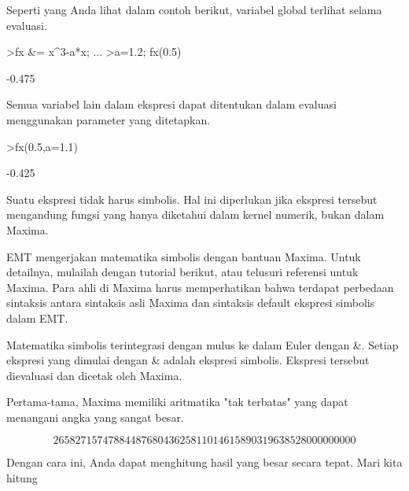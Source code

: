 \documentclass[a4paper,10pt]{article}
\begin{document}
\begin{eulernotebook}
\begin{eulercomment}
\begin{eulercomment}
\begin{eulercomment}
Seperti yang Anda lihat dalam contoh berikut, variabel global terlihat
selama evaluasi.
\end{eulercomment}
\begin{eulerprompt}
>fx &= x^3-a*x;  ...
>a=1.2; fx(0.5)
\end{eulerprompt}
\begin{euleroutput}
  -0.475
\end{euleroutput}
\begin{eulercomment}
Semua variabel lain dalam ekspresi dapat ditentukan dalam evaluasi
menggunakan parameter yang ditetapkan.
\end{eulercomment}
\begin{eulerprompt}
>fx(0.5,a=1.1)
\end{eulerprompt}
\begin{euleroutput}
  -0.425
\end{euleroutput}
\begin{eulercomment}
Suatu ekspresi tidak harus simbolis. Hal ini diperlukan jika ekspresi
tersebut mengandung fungsi yang hanya diketahui dalam kernel numerik,
bukan dalam Maxima.

\begin{eulercomment}
\begin{eulercomment}
EMT mengerjakan matematika simbolis dengan bantuan Maxima. Untuk
detailnya, mulailah dengan tutorial berikut, atau telusuri referensi
untuk Maxima. Para ahli di Maxima harus memperhatikan bahwa terdapat
perbedaan sintaksis antara sintaksis asli Maxima dan sintaksis default
ekspresi simbolis dalam EMT.

Matematika simbolis terintegrasi dengan mulus ke dalam Euler dengan \&.
Setiap ekspresi yang dimulai dengan \& adalah ekspresi simbolis.
Ekspresi tersebut dievaluasi dan dicetak oleh Maxima.

Pertama-tama, Maxima memiliki aritmatika "tak terbatas" yang dapat
menangani angka yang sangat besar.
\end{eulercomment}
\begin{eulerformula}
\[
2658271574788448768043625811014615890319638528000000000
\]
\end{eulerformula}
\begin{eulercomment}
Dengan cara ini, Anda dapat menghitung hasil yang besar secara tepat.
Mari kita hitung


\end{eulercomment}
\end{eulercomment}
\end{eulercomment}
\end{eulercomment}
\end{eulercomment}
\end{eulernotebook}
\end{document}

